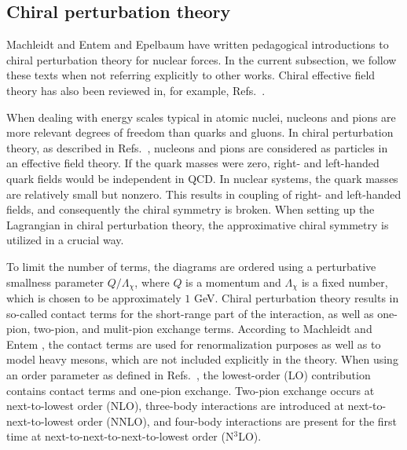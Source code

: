 \documentclass[a4paper,12pt]{report}
\begin{document}





\subsection{Chiral perturbation theory} \label{sec:chiral}

Machleidt and Entem \cite{machleidt2011} and Epelbaum 
\cite{epelbaum2010} have written pedagogical introductions to
chiral perturbation theory for nuclear forces. In the current
subsection, we follow these texts when not referring 
explicitly to other works. 
Chiral effective field theory has also been reviewed in, 
for example, Refs.~\cite{epelbaum2006,epelbaum_2009b}.

When dealing with energy scales typical in atomic nuclei,
nucleons and pions are more relevant degrees of freedom 
than quarks and gluons. In chiral perturbation theory,
as described in Refs.~\cite{epelbaum2010,machleidt2011}, 
nucleons and pions are considered as particles in an 
effective field theory. If the quark masses were zero,
right- and left-handed quark fields would be independent
in QCD. In nuclear systems, the quark masses are relatively 
small but nonzero. This results in coupling of right-
and left-handed fields, and consequently the chiral 
symmetry is broken. When setting up the Lagrangian in
chiral perturbation theory, the approximative chiral
symmetry is utilized in a crucial way. 


To limit the number of terms, the diagrams are ordered
using a perturbative smallness parameter $Q/\Lambda_{\chi }$,
where $Q$ is a momentum and $\Lambda_{\chi }$ is a 
fixed number, which is chosen to be approximately $1$ GeV. 
Chiral perturbation theory results in so-called contact 
terms for the short-range part of the interaction, as well
as one-pion, two-pion, and mulit-pion exchange terms. 
According to Machleidt and Entem \cite{machleidt2011},
the contact terms are used for renormalization purposes
as well as to model heavy mesons, which are not included
explicitly in the theory.
When using an order parameter as defined in 
Refs.~\cite{epelbaum2010,machleidt2011}, the lowest-order
(LO) contribution contains contact terms and one-pion
exchange. Two-pion exchange occurs at next-to-lowest 
order (NLO), three-body interactions are introduced at
next-to-next-to-lowest order (NNLO), and four-body
interactions are present for the first time at 
next-to-next-to-next-to-lowest order (N$^{3}$LO).
\end{document}
